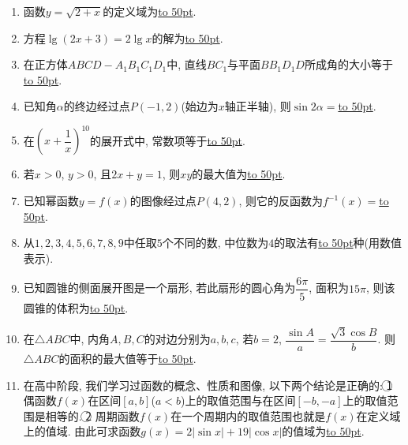 \documentclass[10pt,a4paper]{article}
\newcommand{\blank}[1]{\underline{\hbox to #1pt{}}}
\begin{document}
\begin{enumerate}[1.]

\item 函数$y=\sqrt{2+x}$的定义域为\blank{50}.
\item 方程$\lg(2x+3)=2\lg x$的解为\blank{50}.
\item 在正方体$ABCD-A_1B_1C_1D_1$中, 直线$BC_1$与平面$BB_1D_1D$所成角的大小等于\blank{50}.
\begin{center}
\end{center}
\item 已知角$\alpha$的终边经过点$P(-1,2)$(始边为$x$轴正半轴), 则$\sin 2\alpha=$\blank{50}.
\item 在$(x+\dfrac 1x)^{10}$的展开式中, 常数项等于\blank{50}.
\item 若$x>0$, $y>0$, 且$2x+y=1$, 则$xy$的最大值为\blank{50}.
\item 已知幂函数$y=f(x)$的图像经过点$P(4,2)$, 则它的反函数为$f^{-1}(x)=$\blank{50}.
\item 从$1,2,3,4,5,6,7,8,9$中任取$5$个不同的数, 中位数为$4$的取法有\blank{50}种(用数值表示).
\item 已知圆锥的侧面展开图是一个扇形, 若此扇形的圆心角为$\dfrac{6\pi}5$, 面积为$15\pi$, 则该圆锥的体积为\blank{50}.
\item 在$\triangle ABC$中, 内角$A,B,C$的对边分别为$a,b,c$, 若$b=2$, $\dfrac{\sin A}{a}=\dfrac{\sqrt{3}\cos B}{b}$. 则$\triangle ABC$的面积的最大值等于\blank{50}.
\item 在高中阶段, 我们学习过函数的概念、性质和图像, 以下两个结论是正确的: \textcircled{1} 偶函数$f(x)$在区间$[a,b]$($a<b$)上的取值范围与在区间$[-b,-a]$上的取值范围是相等的. \textcircled{2} 周期函数$f(x)$在一个周期内的取值范围也就是$f(x)$在定义域上的值域. 由此可求函数$g(x)=2|\sin x|+19|\cos x|$的值域为\blank{50}.

\end{enumerate}
\end{document}
